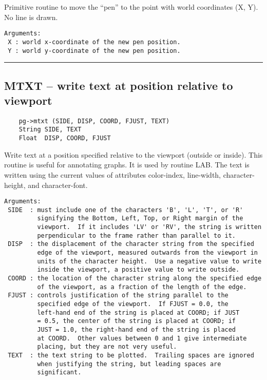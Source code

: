 Primitive routine to move the ``pen'' to the point with world
coordinates (X, Y).  No line is drawn.

\begin{verbatim}
Arguments:
 X : world x-coordinate of the new pen position.
 Y : world y-coordinate of the new pen position.
\end{verbatim}

\hrule

\subsection*{MTXT -- write text at position relative to viewport }

\begin{verbatim}
    pg->mtxt (SIDE, DISP, COORD, FJUST, TEXT)
    String SIDE, TEXT
    Float  DISP, COORD, FJUST
\end{verbatim}

Write text at a position specified relative to the viewport (outside
or inside).  This routine is useful for annotating graphs.  It is used
by routine LAB.  The text is written using the current values of
attributes color-index, line-width, character-height, and
character-font.

\begin{verbatim}
Arguments:
 SIDE  : must include one of the characters 'B', 'L', 'T', or 'R'
         signifying the Bottom, Left, Top, or Right margin of the
         viewport.  If it includes 'LV' or 'RV', the string is written
         perpendicular to the frame rather than parallel to it. 
 DISP  : the displacement of the character string from the specified
         edge of the viewport, measured outwards from the viewport in
         units of the character height.  Use a negative value to write
         inside the viewport, a positive value to write outside. 
 COORD : the location of the character string along the specified edge
         of the viewport, as a fraction of the length of the edge. 
 FJUST : controls justification of the string parallel to the
         specified edge of the viewport.  If FJUST = 0.0, the
         left-hand end of the string is placed at COORD; if JUST
         = 0.5, the center of the string is placed at COORD; if
         JUST = 1.0, the right-hand end of the string is placed
         at COORD.  Other values between 0 and 1 give intermediate
         placing, but they are not very useful. 
 TEXT  : the text string to be plotted.  Trailing spaces are ignored
         when justifying the string, but leading spaces are
         significant. 
\end{verbatim}

